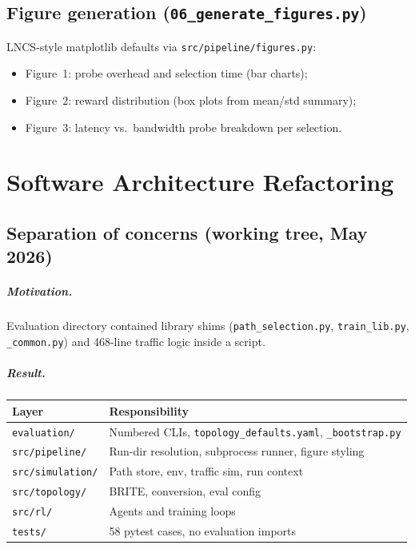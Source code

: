 \documentclass[11pt,a4paper,twoside,openright]{report}
\begin{document}
\section{Figure generation (\texttt{06\_generate\_figures.py})}

LNCS-style matplotlib defaults via \texttt{src/pipeline/figures.py}:
\begin{itemize}
  \item Figure~1: probe overhead and selection time (bar charts);
  \item Figure~2: reward distribution (box plots from mean/std summary);
  \item Figure~3: latency vs.\ bandwidth probe breakdown per selection.
\end{itemize}

\chapter{Software Architecture Refactoring}

\section{Separation of concerns (working tree, May 2026)}

\paragraph{Motivation.}
Evaluation directory contained library shims
(\texttt{path\_selection.py}, \texttt{train\_lib.py}, \texttt{\_common.py}) and
468-line traffic logic inside a script.

\paragraph{Result.}
\begin{center}
\begin{tabular}{ll}
\toprule
Layer & Responsibility \\
\midrule
\texttt{evaluation/} & Numbered CLIs, \texttt{topology\_defaults.yaml}, \texttt{\_bootstrap.py} \\
\texttt{src/pipeline/} & Run-dir resolution, subprocess runner, figure styling \\
\texttt{src/simulation/} & Path store, env, traffic sim, run context \\
\texttt{src/topology/} & BRITE, conversion, eval config \\
\texttt{src/rl/} & Agents and training loops \\
\texttt{tests/} & 58 pytest cases, no evaluation imports \\
\bottomrule
\end{tabular}
\end{center}
\end{document}
